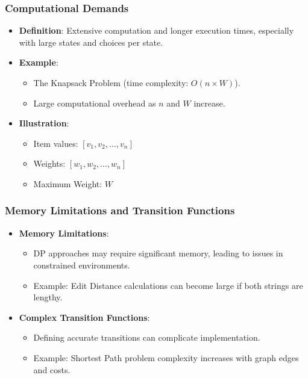 \documentclass[aspectratio=169]{beamer}
\begin{document}
\begin{frame}[fragile]
    \frametitle{Computational Demands}
    \begin{itemize}
        \item \textbf{Definition}: Extensive computation and longer execution times, especially with large states and choices per state.
        \item \textbf{Example}:
            \begin{itemize}
                \item The Knapsack Problem (time complexity: \( O(n \times W) \)).
                \item Large computational overhead as \( n \) and \( W \) increase.
            \end{itemize}
        \item \textbf{Illustration}:
            \begin{itemize}
                \item Item values: \([v_1, v_2, \ldots, v_n]\)
                \item Weights: \([w_1, w_2, \ldots, w_n]\)
                \item Maximum Weight: \( W \)
            \end{itemize}
    \end{itemize}
\end{frame}

\begin{frame}[fragile]
    \frametitle{Memory Limitations and Transition Functions}
    \begin{itemize}
        \item \textbf{Memory Limitations}:
            \begin{itemize}
                \item DP approaches may require significant memory, leading to issues in constrained environments.
                \item Example: Edit Distance calculations can become large if both strings are lengthy.
            \end{itemize}
        \item \textbf{Complex Transition Functions}:
            \begin{itemize}
                \item Defining accurate transitions can complicate implementation.
                \item Example: Shortest Path problem complexity increases with graph edges and costs.
            \end{itemize}
    \end{itemize}
\end{frame}
\end{document}
